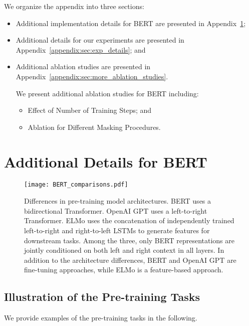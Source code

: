 \documentclass[11pt,a4paper]{article}
\newcommand\bert{BERT\xspace}
\begin{document}
We organize the appendix into three sections:
\begin{itemize}
   \item Additional implementation details for BERT are presented in Appendix~\ref{appendix:sec:bert_description};
   
   \item Additional details for our experiments are presented in Appendix~\ref{appendix:sec:exp_details}; and
   
   
   \item Additional ablation studies are presented in Appendix~\ref{appendix:sec:more_ablation_studies}.
   
   We present additional ablation studies for BERT including:
   \begin{itemize}
      \item Effect of Number of Training Steps; and
      \item Ablation for Different Masking Procedures.
   \end{itemize}
\end{itemize}
\section{Additional Details for BERT}
\label{appendix:sec:bert_description}



\begin{figure*}[ht]
\begin{center}
\texttt{[image: BERT\_comparisons.pdf]}
\end{center}
\caption{Differences in pre-training model architectures. BERT uses a bidirectional Transformer. OpenAI GPT uses a left-to-right Transformer. ELMo uses the concatenation of independently trained left-to-right and right-to-left LSTMs to generate features for downstream tasks. Among the three, only \bert representations are jointly conditioned on both left and right context in all layers. In addition to the architecture differences, BERT and OpenAI GPT are fine-tuning approaches, while ELMo is a feature-based approach.}
\label{fig:BERT_comparisons}
\end{figure*}


\subsection{Illustration of the Pre-training Tasks}
We provide examples of the pre-training tasks in the following.
\end{document}
